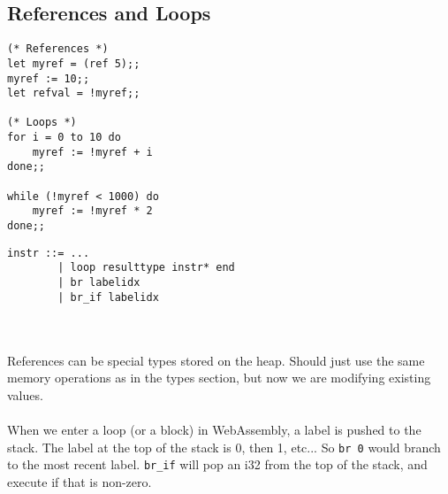 \documentclass{article}
\newcommand{\textinline}{\texttt}
\begin{document}
\subsection{References and Loops}
\begin{minipage}{0.4\linewidth}
\begin{verbatim}
(* References *)
let myref = (ref 5);;
myref := 10;;
let refval = !myref;;

(* Loops *)
for i = 0 to 10 do
    myref := !myref + i
done;;

while (!myref < 1000) do
    myref := !myref * 2
done;;
\end{verbatim}
\end{minipage}  
\begin{minipage}{0.6\linewidth}
\begin{verbatim}
instr ::= ...
        | loop resulttype instr* end
        | br labelidx
        | br_if labelidx
\end{verbatim}
\end{minipage}
\\\\
References can be special types stored on the heap. Should just use the same memory operations as in the types section, but now we are modifying existing values.
\\\\
When we enter a loop (or a block) in WebAssembly, a label is pushed to the stack. The label at the top of the stack is 0, then 1, etc... So \textinline{br 0} would branch to the most recent label. \textinline{br_if} will pop an i32 from the top of the stack, and execute if that is non-zero.
\end{document}
